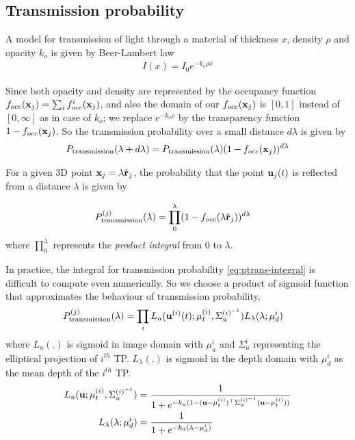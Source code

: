 \subsection{Transmission probability}
A model for transmission of light through a material of thickness $x$,
density $\rho$ and opacity $k_o$ is given by Beer-Lambert law 
%
\begin{align}
  I(x) = I_0e^{-k_o\rho x}
\end{align}
%

Since both opacity and density are represented by the occupancy function
$f_{occ}(\mathbf{x}_j) = \sum_i f^i_{occ}(\mathbf{x}_j)$, and also the domain of our $f_{occ}(\mathbf{x}_j)$ is $[0, 1]$ instead of $[0,
\infty]$ as in case of $k_o$; we replace $e^{-k_o\rho}$ by the transparency
function $1 - f_{occ}(\mathbf{x}_j)$. So the transmission probability over a small distance
$d\lambda$ is given by
%
\begin{align}
  P_{\text{transmission}}(\lambda + d\lambda) =
  P_{\text{transmission}}(\lambda) (1-f_{occ}(\mathbf{x}_j))^{d\lambda}
\end{align}
%

For a given 3D point $\mathbf{x}_j = \lambda \hat{\mathbf{r}}_j$, the probability that the
point $\mathbf{u}_j(t)$ is reflected from a distance $\lambda$ is given by

\begin{align}
  \Ptrans &=
  \prod_{0}^{\lambda} (1 - \occft{\lambda \ray})^{d\lambda} %
  \label{eq:ptrans-integral}
\end{align}
where $\prod_{0}^{\lambda}$ represents the \emph{product integral} from $0$ to
$\lambda$. 

In practice, the integral for transmission probability
\eqref{eq:ptrans-integral} is difficult to compute even numerically. So we
choose a product of sigmoid function that approximates the behaviour of
transmission probability,
%
\begin{align}
\label{eq:evalCumulativePtrans}
  P^{(j)}_{\text{transmission}}(\lambda) &= \prod_i L_u(\mathbf{u}^{(i)}(t); \mu^{(i)}_t,\Sigma^{(i)^{-1}}_u)L_{\lambda}(\lambda; \mu^i_d)
\end{align}
%
where $L_u(.)$ is sigmoid in image domain with $\mu^i_u$ and $\Sigma^i_u$
representing the elliptical projection of $i^{th}$ TP.
$L_{\lambda}(.)$ is sigmoid in the depth domain with $\mu^i_d$ as the mean
depth of the $i^{th}$ TP.
%
\begin{align}
  L_u(\mathbf{u}; \mu^{(i)}_t,\Sigma^{(i)^{-1}}_u) &= \frac{1}{
    1 + e^{-k_u(1 - (\mathbf{u} - \mu^{(i)}_t)^\top\Sigma^{(i)^{-1}}_u(\mathbf{u} -
    \mu^{(i)}_t))}
  }
  \\
  L_{\lambda}(\lambda; \mu^i_d) &= \frac{1}{
    1 + e^{-k_d(\lambda - \mu^i_d)}
}
\end{align}
%

\begin{comment}%
  A product integral is a simple integral in log domain
  \begin{align}
    \prod_{0}^{\lambda} (1 - f_{occ}(\lambda \ray))^{d\lambda} =
    e^{\int_{1}^{\lambda} \ln{(1 - f_{occ}(\lambda \ray))}{d\lambda}}
  \end{align}
\end{comment}%

